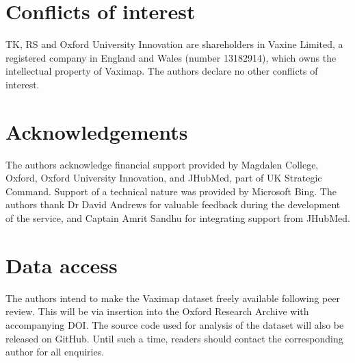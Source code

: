 \documentclass{article}
\def\vm{Vaximap}
\begin{document}
\section{Conflicts of interest}

TK, RS and Oxford University Innovation are shareholders in Vaxine Limited, a registered company in England and Wales (number 13182914), which owns the intellectual property of Vaximap. The authors declare no other conflicts of interest. 

\section{Acknowledgements}

The authors acknowledge financial support provided by Magdalen College, Oxford, Oxford University Innovation, and JHubMed, part of UK Strategic Command. Support of a technical nature was provided by Microsoft Bing. The authors thank Dr David Andrews for valuable feedback during the development of the service, and Captain Amrit Sandhu for integrating support from JHubMed. 

\section{Data access}

The authors intend to make the \vm{} dataset freely available following peer review. This will be via insertion into the Oxford Research Archive with accompanying DOI. The source code used for analysis of the dataset will also be released on GitHub. Until such a time, readers should contact the corresponding author for all enquiries. 




\end{document}
